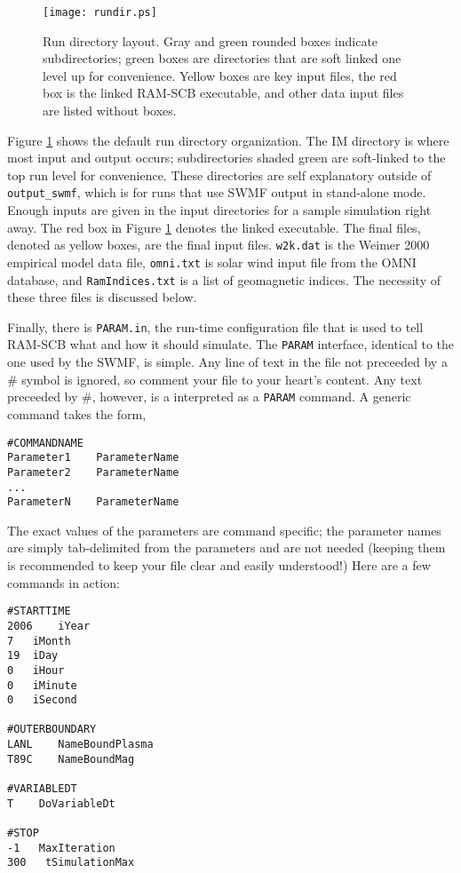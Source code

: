 \begin{figure}[h]
 \begin{center}
  \texttt{[image: rundir.ps]}
 \end{center}
 \caption{Run directory layout. Gray and green rounded boxes indicate subdirectories; green boxes are directories that are soft linked one level up for convenience. Yellow boxes are key input files, the red box is the linked RAM-SCB executable, and other data input files are listed without boxes.}
 \label{fig:rundir}
\end{figure}

Figure \ref{fig:rundir} shows the default run directory organization. The IM directory is where most input and output occurs; subdirectories shaded green are soft-linked to the top run level for convenience. These directories are self explanatory outside of {\tt output\_swmf}, which is for runs that use SWMF output in stand-alone mode. Enough inputs are given in the input directories for a sample simulation right away. The red box in Figure \ref{fig:rundir} denotes the linked executable. The final files, denoted as yellow boxes, are the final input files. {\tt w2k.dat} is the Weimer 2000 empirical model data file, {\tt omni.txt} is solar wind input file from the OMNI database, and {\tt RamIndices.txt} is a list of geomagnetic indices. The necessity of these three files is discussed below.

Finally, there is {\tt PARAM.in}, the run-time configuration file that is used to tell RAM-SCB what and how it should simulate. The {\tt PARAM} interface, identical to the one used by the SWMF, is simple. Any line of text in the file not preceeded by a \# symbol is ignored, so comment your file to your heart's content. Any text preceeded by \#, however, is a interpreted as a {\tt PARAM} command. A generic command takes the form,

\begin{verbatim}
#COMMANDNAME
Parameter1    ParameterName
Parameter2    ParameterName
...
ParameterN    ParameterName
\end{verbatim}

The exact values of the parameters are command specific; the parameter names are simply tab-delimited from the parameters and are not needed (keeping them is recommended to keep your file clear and easily understood!) Here are a few commands in action:

\begin{verbatim}
#STARTTIME 
2006	iYear 
7	iMonth 
19	iDay 
0	iHour 
0	iMinute 
0	iSecond

#OUTERBOUNDARY 
LANL	NameBoundPlasma 
T89C	NameBoundMag

#VARIABLEDT
T    DoVariableDt

#STOP
-1   MaxIteration
300   tSimulationMax
\end{verbatim}


